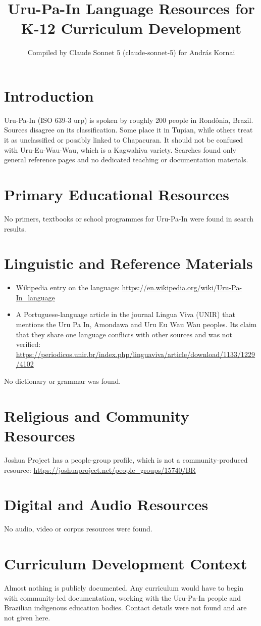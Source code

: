 \documentclass[12pt]{article}
\title{Uru-Pa-In Language Resources for K-12 Curriculum Development}
\author{Compiled by Claude Sonnet 5 (claude-sonnet-5) for Andr\'as Kornai}
\date{}
\begin{document}
\maketitle

\section{Introduction}
Uru-Pa-In (ISO 639-3 urp) is spoken by roughly 200 people in Rond\^onia, Brazil. Sources disagree on its classification. Some place it in Tupian, while others treat it as unclassified or possibly linked to Chapacuran. It should not be confused with Uru-Eu-Wau-Wau, which is a Kagwahiva variety. Searches found only general reference pages and no dedicated teaching or documentation materials.

\section{Primary Educational Resources}
No primers, textbooks or school programmes for Uru-Pa-In were found in search results.

\section{Linguistic and Reference Materials}
\begin{itemize}
\item Wikipedia entry on the language: \url{https://en.wikipedia.org/wiki/Uru-Pa-In_language}
\item A Portuguese-language article in the journal Lingua Viva (UNIR) that mentions the Uru Pa In, Amondawa and Uru Eu Wau Wau peoples. Its claim that they share one language conflicts with other sources and was not verified: \url{https://periodicos.unir.br/index.php/linguaviva/article/download/1133/1229/4102}
\end{itemize}
No dictionary or grammar was found.

\section{Religious and Community Resources}
Joshua Project has a people-group profile, which is not a community-produced resource: \url{https://joshuaproject.net/people_groups/15740/BR}

\section{Digital and Audio Resources}
No audio, video or corpus resources were found.

\section{Curriculum Development Context}
Almost nothing is publicly documented. Any curriculum would have to begin with community-led documentation, working with the Uru-Pa-In people and Brazilian indigenous education bodies. Contact details were not found and are not given here.
\end{document}
